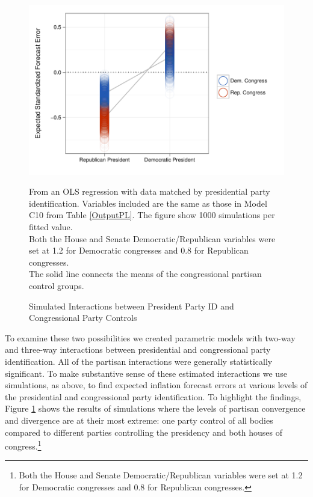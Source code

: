 \documentclass[a4paper]{article}\usepackage{graphicx, color}
\newenvironment{knitrout}{}{} %
\begin{document}
\begin{figure}[t]
    \caption{Simulated Interactions between President Party ID and Congressional Party Controls}
    \label{InterPlot}
    \begin{center}

\begin{knitrout}
\color{fgcolor}\includegraphics[width=0.8\linewidth]{figure/InterPlot} 
\end{knitrout}


    \end{center}
    \begin{singlespace}
        {\scriptsize{From an OLS regression with data matched by presidential party identification. Variables included are the same as those in Model C10 from Table \ref{OutputPL}. The figure show 1000 simulations per fitted value. \\ Both the House and Senate Democratic/Republican variables were set at 1.2 for Democratic congresses and 0.8 for Republican congresses. \\ The solid line connects the means of the congressional partisan control groups.}}
    \end{singlespace}
\end{figure}

To examine these two possibilities we created parametric models with two-way and three-way interactions between presidential and congressional party identification. All of the partisan interactions were generally statistically significant. To make substantive sense of these estimated interactions we use simulations, as above, to find expected inflation forecast errors at various levels of the presidential and congressional party identification. To highlight the findings, Figure \ref{InterPlot} shows the results of simulations where the levels of partisan convergence and divergence are at their most extreme: one party control of all bodies compared to different parties controlling the presidency and both houses of congress.\footnote{Both the House and Senate Democratic/Republican variables were set at 1.2 for Democratic congresses and 0.8 for Republican congresses.} 
\end{document}
